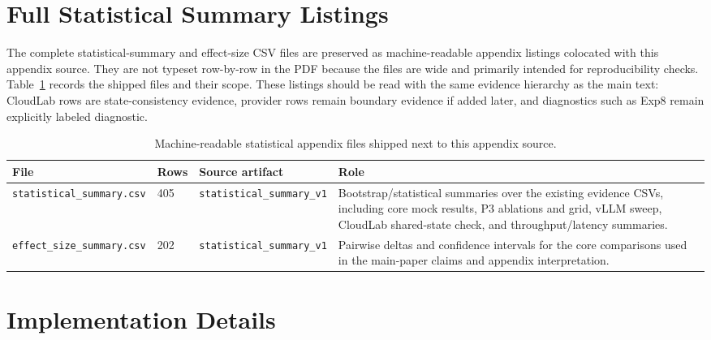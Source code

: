 \documentclass[sigconf,anonymous]{acmart}
\begin{document}
\section{Full Statistical Summary Listings}
\label{sec:statistical_summary_appendix}

The complete statistical-summary and effect-size CSV files are preserved as machine-readable appendix listings colocated with this appendix source. They are not typeset row-by-row in the PDF because the files are wide and primarily intended for reproducibility checks. Table~\ref{tab:statistical_summary_files} records the shipped files and their scope. These listings should be read with the same evidence hierarchy as the main text: CloudLab rows are state-consistency evidence, provider rows remain boundary evidence if added later, and diagnostics such as Exp8 remain explicitly labeled diagnostic.

\begin{table}[h]
\caption{Machine-readable statistical appendix files shipped next to this appendix source.}
\label{tab:statistical_summary_files}
\small
\begin{tabular}{@{}lllp{}@{}}
\toprule
File & Rows & Source artifact & Role \\
\midrule
\texttt{statistical\_summary.csv} & 405 & \texttt{statistical\_summary\_v1} & Bootstrap/statistical summaries over the existing evidence CSVs, including core mock results, P3 ablations and grid, vLLM sweep, CloudLab shared-state check, and throughput/latency summaries. \\
\texttt{effect\_size\_summary.csv} & 202 & \texttt{statistical\_summary\_v1} & Pairwise deltas and confidence intervals for the core comparisons used in the main-paper claims and appendix interpretation. \\
\bottomrule
\end{tabular}
\end{table}

\clearpage


\section{Implementation Details}
\label{sec:impl_details}
\end{document}
